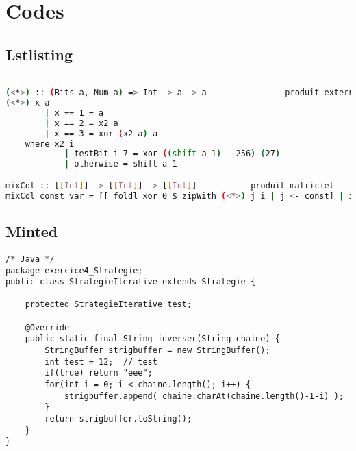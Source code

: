 \section{Codes}


\subsection{Lstlisting}


\lstset{language=Haskell}   %

\begin{lstlisting}[language={bash}, caption={}, label={lst:}, float, floatplacement=H]  % Start your code-block

(<*>) :: (Bits a, Num a) => Int -> a -> a             -- produit externe
(<*>) x a
        | x == 1 = a
        | x == 2 = x2 a
        | x == 3 = xor (x2 a) a
    where x2 i
            | testBit i 7 = xor ((shift a 1) - 256) (27)
            | otherwise = shift a 1

mixCol :: [[Int]] -> [[Int]] -> [[Int]]        -- produit matriciel
mixCol const var = [[ foldl xor 0 $ zipWith (<*>) j i | j <- const] | i <- (transpose var)]

\end{lstlisting}





\lstlistoflistings




\subsection{Minted}

\begin{verbatim}
/* Java */
package exercice4_Strategie;
public class StrategieIterative extends Strategie {

	protected StrategieIterative test;
	
	@Override
	public static final String inverser(String chaine) {
		StringBuffer strigbuffer = new StringBuffer();
		int test = 12;	// test 
		if(true) return "eee";
		for(int i = 0; i < chaine.length(); i++) {
			strigbuffer.append( chaine.charAt(chaine.length()-1-i) );
		}
		return strigbuffer.toString();
	}
}
\end{verbatim}


